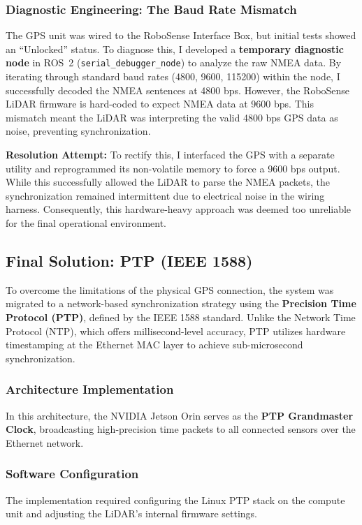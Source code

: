 \documentclass[12pt,a4paper]{report}
\begin{document}
\subsubsection{Diagnostic Engineering: The Baud Rate Mismatch}
The GPS unit was wired to the RoboSense Interface Box, but initial tests showed an ``Unlocked'' status. To diagnose this, I developed a \textbf{temporary diagnostic node} in ROS~2 (\texttt{serial\_debugger\_node}) to analyze the raw NMEA data.
By iterating through standard baud rates (4800, 9600, 115200) within the node, I successfully decoded the NMEA sentences at 4800 bps. However, the RoboSense LiDAR firmware is hard-coded to expect NMEA data at 9600 bps. This mismatch meant the LiDAR was interpreting the valid 4800 bps GPS data as noise, preventing synchronization.

\textbf{Resolution Attempt:}
To rectify this, I interfaced the GPS with a separate utility and reprogrammed its non-volatile memory to force a 9600 bps output. While this successfully allowed the LiDAR to parse the NMEA packets, the synchronization remained intermittent due to electrical noise in the wiring harness. Consequently, this hardware-heavy approach was deemed too unreliable for the final operational environment.

\subsection[Final Solution: PTP]{Final Solution: PTP (IEEE 1588)}
To overcome the limitations of the physical GPS connection, the system was migrated to a network-based synchronization strategy using the \textbf{Precision Time Protocol (PTP)}, defined by the IEEE 1588 standard. Unlike the Network Time Protocol (NTP), which offers millisecond-level accuracy, PTP utilizes hardware timestamping at the Ethernet MAC layer to achieve sub-microsecond synchronization.

\subsubsection{Architecture Implementation}
In this architecture, the NVIDIA Jetson Orin serves as the \textbf{PTP Grandmaster Clock}, broadcasting high-precision time packets to all connected sensors over the Ethernet network.

\subsubsection{Software Configuration}
The implementation required configuring the Linux PTP stack on the compute unit and adjusting the LiDAR's internal firmware settings.
\end{document}
